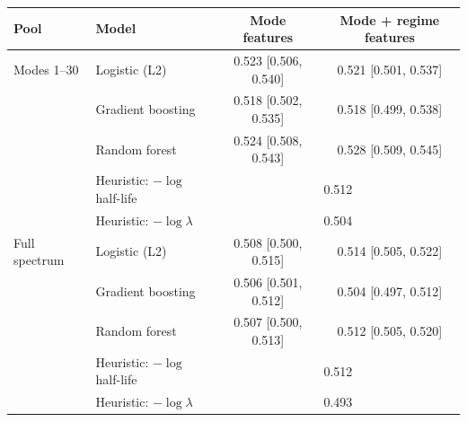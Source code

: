 \begin{tabular}{llcc}
\toprule
Pool & Model & Mode features & Mode + regime features \\
\midrule
Modes 1--30 & Logistic (L2) & 0.523 [0.506, 0.540] & 0.521 [0.501, 0.537] \\
 & Gradient boosting & 0.518 [0.502, 0.535] & 0.518 [0.499, 0.538] \\
 & Random forest & 0.524 [0.508, 0.543] & 0.528 [0.509, 0.545] \\
 & Heuristic: $-\log$ half-life & \multicolumn{2}{c}{0.512} \\
 & Heuristic: $-\log\lambda$ & \multicolumn{2}{c}{0.504} \\
\midrule
Full spectrum & Logistic (L2) & 0.508 [0.500, 0.515] & 0.514 [0.505, 0.522] \\
 & Gradient boosting & 0.506 [0.501, 0.512] & 0.504 [0.497, 0.512] \\
 & Random forest & 0.507 [0.500, 0.513] & 0.512 [0.505, 0.520] \\
 & Heuristic: $-\log$ half-life & \multicolumn{2}{c}{0.512} \\
 & Heuristic: $-\log\lambda$ & \multicolumn{2}{c}{0.493} \\
\bottomrule
\end{tabular}